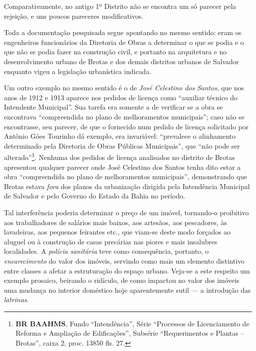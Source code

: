 Comparativamente, no antigo 1º Distrito não se encontra um só parecer pela rejeição, e uns poucos pareceres modificativos.  

Toda a documentação pesquisada segue apontando no mesmo sentido: eram os engenheiros funcionários da Diretoria de Obras a determinar o que se podia e o que não se podia fazer na construção civil, e portanto na arquitetura e no desenvolvimento urbano de Brotas e dos demais distritos urbanos de Salvador enquanto vigeu a legislação urbanística indicada.

Um outro exemplo no mesmo sentido é o de \textit{José Celestino dos Santos}, que nos anos de 1912 e 1913 aparece nos pedidos de licença como ``auxiliar técnico do Intendente Municipal''. Sua tarefa era somente a de verificar se a obra se encontrava ``compreendida no plano de melhoramentos municipais''; caso não se encontrasse, seu parecer, de que o fornecido num pedido de licença solicitado por Antônio Góes Tourinho dá exemplo, era invariável: ``prevalece o  alinhamento determinado pela Diretoria de Obras Públicas Municipais'', que ``não pode ser alterado''\footnote{\textbf{BR BAAHMS}, Fundo ``Intendência'', Série ``Processos de Licenciamento de Reforma e Ampliação de Edificações'', Subsérie ``Requerimentos e Plantas – Brotas'', caixa 2, proc. 13850 fls. 27.}. Nenhuma dos pedidos de licença analisados no distrito de Brotas apresentou qualquer parecer onde José Celestino dos Santos tenha dito estar a obra ``compreendida no plano de melhoramentos municipais'', demonstrando que Brotas estava \textit{fora} dos planos da urbanização dirigida pela Intendência Municipal de Salvador e pelo Governo do Estado da Bahia no período.

Tal interferência poderia determinar o preço de um imóvel, tornando-o proibitivo aos trabalhadores de salários mais baixos, aos artesãos, aos pescadores, às lavadeiras, aos pequenos feirantes etc., que viam-se deste modo forçados ao aluguel ou à construção de casas precárias nas piores e mais insalubres localidades. A \textit{polícia sanitária} teve como consequência, portanto, o \textit{encarecimento} do valor dos imóveis, servindo como mais um elemento distintivo entre classes a afetar a estruturação do espaço urbano. Veja-se a este respeito um exemplo prosaico, beirando o ridículo, de como impactou no valor dos imóveis uma mudança no interior doméstico hoje aparentemente sutil --- a introdução das \textit{latrinas}. 

